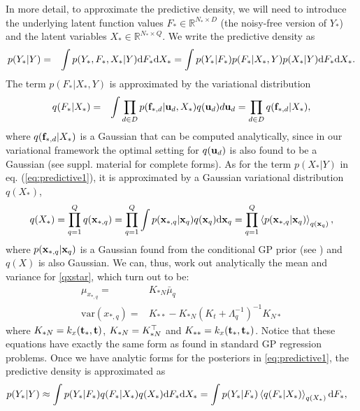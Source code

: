 \documentclass [10pt , a4paper]{article}
\begin{document}
\par In more detail, to approximate the predictive density, we will need to introduce the underlying latent function
values $F_* \in \mathbb{R}^{N_* \times D}$ (the noisy-free version of $Y_*$) and the latent variables $X_* \in \mathbb{R}^{N_* \times Q}$. We  write the predictive density as
\begin{eqnarray}
p(Y_* | Y) & = & \int p(Y_*, F_*, X_*| Y) \text{d}  F_* \text{d}  X_* =  \int p(Y_* | F_*)  p(F_*|X_*, Y) p(X_*|  Y) \text{d}  F_* \text{d}  X_* .
\label{eq:predictive1}
\end{eqnarray}
The term $p(F_* |X_*, Y)$ is approximated by the variational distribution
\begin{eqnarray}
q(F_*|X_*) & = & \int \prod_{d \in D} p(\mathbf{f}_{*,d} | \mathbf{u}_d, X_*)  q(\mathbf{u}_d) d \mathbf{u}_d 
	    = \prod_{d \in D} q(\mathbf{f}_{*,d} | X_*)  ,
\end{eqnarray}
where $q(\mathbf{f}_{*,d} | X_*)$ is a Gaussian that can be computed analytically,
since in our variational framework the optimal setting for $q(\mathbf{u}_d)$ is also found to be a Gaussian (see suppl. material for complete forms).
%
As for the term $p(X_*| Y)$ in eq. (\ref{eq:predictive1}), it is approximated by
a Gaussian variational distribution $q(X_*)$,
%
\begin{align}
 q(X_*) = \prod_{q=1}^Q q(\mathbf{x}_{*,q}) = 
\prod_{q=1}^Q   \int  p(\mathbf{x}_{*,q} | \mathbf{x}_q) q(\mathbf{x}_q) \text{d} \mathbf{x}_q = \prod_{q=1}^Q \left\langle  p(\mathbf{x}_{*,q} | \mathbf{x}_q) \right\rangle_{q(\mathbf{x}_q)} ,\label{qxstar}
\end{align}
%
where $p(\mathbf{x}_{*,q} | \mathbf{x}_q)$ is a Gaussian found from the conditional GP prior
(see \cite{rasmussen-williams}) and $q(X)$ is also Gaussian. We can, thus, work out analytically the mean and variance 
for \eqref{qxstar}, which turn out to be:
\begin{align}
 \mu_{x_{*,q}} = {}& K_{*N} \bar{\mu}_q \\
  \text{var}(x_{*,q}) = {}& K_{**} - K_{*N} (K_t + \Lambda_q^{-1})^{-1} K_{N*}
\end{align}
where $K_{*N} = k_x(\mathbf{t}_*, \mathbf{t})$, $K_{*N} = K_{*N}^{\top}$ and $K_{**} = k_x(\mathbf{t}_*, \mathbf{t}_*)$. Notice that these equations have
exactly the same form as found in standard GP regression problems.
%
Once we have analytic forms for the posteriors in \eqref{eq:predictive1}, the predictive density is approximated as
\begin{align} 
p(Y_*| Y) {}& \approx  \int p(Y_*| F_*)  q(F_*|X_*) q(X_*) \text{d} F_* \text{d} X_* = \int p(Y_* | F_*) \left\langle q(F_* | X_*) \right\rangle_{q(X_*)} \text{d} F_* , \label{eq:predictive2}
\end{align}
\end{document}
